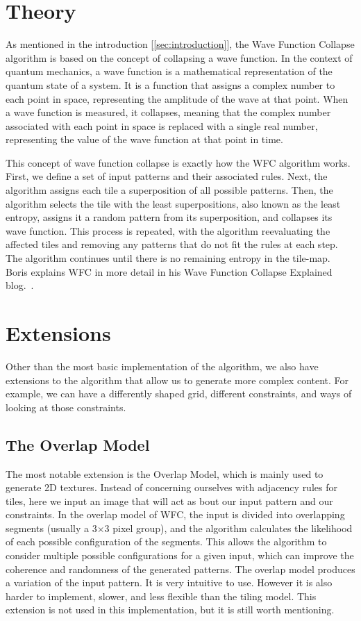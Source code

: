 \documentclass[10pt,oneside,a4paper]{article}
\begin{document}
\section{Theory}\label{sec:theory}
As mentioned in the introduction [\ref*{sec:introduction}], the Wave Function Collapse algorithm is based on the concept of collapsing a wave function.
In the context of quantum mechanics, a wave function is a mathematical representation of the quantum state of a system.
It is a function that assigns a complex number to each point in space, representing the amplitude of the wave at that point.
When a wave function is measured, it collapses, meaning that the complex number associated with each point in space is replaced with a single real number, representing the value of the wave function at that point in time.

This concept of wave function collapse is exactly how the WFC algorithm works.
First, we define a set of input patterns and their associated rules.
Next, the algorithm assigns each tile a superposition of all possible patterns.
Then, the algorithm selects the tile with the least superpositions, also known as the least entropy, assigns it a random pattern from its superposition, and collapses its wave function.
This process is repeated, with the algorithm reevaluating the affected tiles and removing any patterns that do not fit the rules at each step.
The algorithm continues until there is no remaining entropy in the tile-map.
Boris explains WFC in more detail in his Wave Function Collapse Explained blog.~\cite{WFCE}.

\section{Extensions}\label{sec:extensions}
Other than the most basic implementation of the algorithm, we also have extensions to the algorithm that allow us to generate more complex content.
For example, we can have a differently shaped grid, different constraints, and ways of looking at those constraints.

\subsection{The Overlap Model}
The most notable extension is the Overlap Model, which is mainly used to generate 2D textures.
Instead of concerning ourselves with adjacency rules for tiles, here we input an image that will act as bout our input pattern and our constraints.
In the overlap model of WFC, the input is divided into overlapping segments (usually a 3$\times$3 pixel group), and the algorithm calculates the likelihood of each possible configuration of the segments.
This allows the algorithm to consider multiple possible configurations for a given input, which can improve the coherence and randomness of the generated patterns.
The overlap model produces a variation of the input pattern.
It is very intuitive to use. However it is also harder to implement, slower, and less flexible than the tiling model.
This extension is not used in this implementation, but it is still worth mentioning.
\end{document}

